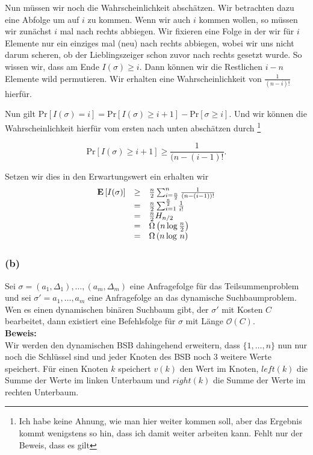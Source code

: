 \documentclass[11pt,a4paper,ngerman]{article}
\newcommand{\erw}[1]{\text{\bfseries E} \left[ #1 \right]}
\newcommand{\prob}[1]{\text{Pr}\left[ #1 \right]}
\begin{document}
Nun müssen wir noch die Wahrscheinlichkeit abschätzen. Wir betrachten dazu eine Abfolge um auf $i$ zu kommen. Wenn wir auch $i$ kommen
wollen, so müssen wir zunächst $i$ mal nach rechts abbiegen. Wir fixieren eine Folge in der wir für $i$ Elemente nur ein einziges mal (neu) nach rechts abbiegen, wobei wir uns nicht darum scheren, ob der Lieblingszeiger schon zuvor nach rechts gesetzt wurde. So wissen wir, dass am Ende
$I(\sigma) \geq i$. Dann können wir die Restlichen $i-n$ Elemente wild permutieren. Wir erhalten eine
Wahrscheinlichkeit von $\frac{1}{(n-i)!}$ hierfür.

Nun gilt $\prob{I(\sigma) = i} = \prob{I(\sigma) \geq i+1} -  \prob{\sigma \geq i}$. Und wir können die Wahrscheinlichkeit hierfür vom
ersten nach unten abschätzen durch \footnote{Ich habe keine Ahnung, wie man hier weiter kommen soll, aber das Ergebnis
kommt wenigstens so hin, dass ich damit weiter arbeiten kann. Fehlt nur der Beweis, dass es gilt}

$$\prob{I(\sigma) \geq i + 1} \geq \frac{1}{(n- (i-1)!}.$$

Setzen wir dies in den Erwartungswert ein erhalten wir
$$\begin{array}{rcl}
	\erw{I(\sigma)} &\geq& \frac{n}{2} \sum_{i=\frac{n}{2}}^n  \frac{1}{(n-(i-1))!}\\
		&=& \frac{n}{2} \sum_{i=1}^{\frac{n}{2}} \frac{1}{i!}\\
		&=& \frac{n}{2} H_{n/2}\\
		&=& \Omega \left(n \log \frac{n}{2} \right)\\
		&=& \Omega \left( n \log \, n \right)
\end{array}$$


\subsubsection*{(b)} Sei $\sigma = (a_1, \Delta_1), \ldots, (a_m, \Delta_m)$ eine Anfragefolge für das Teilsummenproblem und sei $\sigma' = a_1, \ldots, a_m$ eine Anfragefolge an das dynamische Suchbaumproblem. Wen es einen dynamischen binären Suchbaum gibt, der $\sigma'$ mit Kosten $C$ bearbeitet, dann existiert eine Befehlsfolge für $\sigma$ mit Länge $\mathcal{O}(C)$.\\

\noindent\textbf{Beweis:}\\

Wir werden den dynamischen BSB dahingehend erweitern, dass $\{1, \ldots, n\}$ nun nur noch die Schlüssel sind und jeder Knoten des BSB
noch 3 weitere Werte speichert. Für einen Knoten $k$ speichert $v(k)$ den Wert im Knoten, $left(k)$ die Summe der Werte im linken Unterbaum
und $right(k)$ die Summe der Werte im rechten Unterbaum.\\
\end{document}
